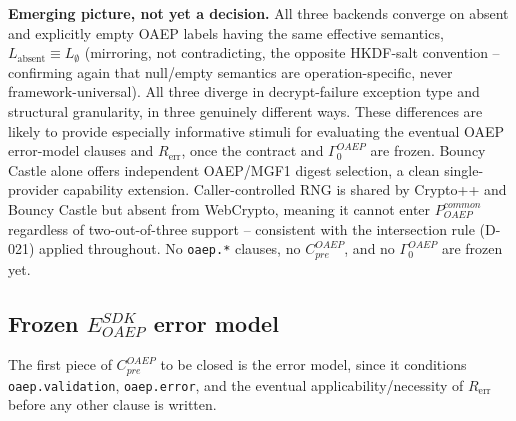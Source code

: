 \documentclass[11pt,a4paper]{article}
\begin{document}
\textbf{Emerging picture, not yet a decision.} All three backends converge on absent and explicitly empty OAEP labels having the same effective semantics, $L_{\text{absent}} \equiv L_{\emptyset}$ (mirroring, not contradicting, the opposite HKDF-salt convention -- confirming again that null/empty semantics are operation-specific, never framework-universal). All three diverge in decrypt-failure exception type and structural granularity, in three genuinely different ways. These differences are likely to provide especially informative stimuli for evaluating the eventual OAEP error-model clauses and $R_{\text{err}}$, once the contract and $\Gamma_0^{OAEP}$ are frozen. Bouncy Castle alone offers independent OAEP/MGF1 digest selection, a clean single-provider capability extension. Caller-controlled RNG is shared by Crypto++ and Bouncy Castle but absent from WebCrypto, meaning it cannot enter $P_{OAEP}^{common}$ regardless of two-out-of-three support -- consistent with the intersection rule (D-021) applied throughout. No \texttt{oaep.*} clauses, no $C_{pre}^{OAEP}$, and no $\Gamma_0^{OAEP}$ are frozen yet.

\subsection{Frozen $E_{OAEP}^{SDK}$ error model}\label{sec:oaep-error-model}
The first piece of $C_{pre}^{OAEP}$ to be closed is the error model, since it conditions \texttt{oaep.validation}, \texttt{oaep.error}, and the eventual applicability/necessity of $R_{\text{err}}$ before any other clause is written.
\end{document}
